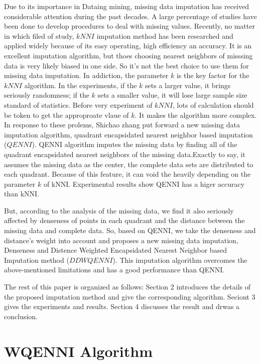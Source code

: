 \documentclass[print]{jicspack}
\begin{document}
Due to its importance in Dataing mining, missing data imputation has received considerable attention during the past decades. A large percentage of studies have been done to develop procedures to deal with missing values. Recently, no matter in which filed of study, $kNNI$ \cite{NumeApp} imputation method has been researched and applied widely because of its easy operating, high efficiency an accuracy. It is an excellent imputation algorithm, but thoes choosing nearest neighbors of misssing data is very likely biased in one side. So it's not the best choice to use them for missing data imputation. In addiction, the parameter $k$ is the key factor for the $kNNI$ algorithm. In the experiments, if the $k$ sets a larger value, it brings seriously randomness; if the $k$ sets a smaller value, it will lose large sample size standard of statistics. Before very experiment of $kNNI$, lots of calculation should be token to get the approproate vlaue of $k$. It makes the algorithm more complex. In response to these prolems, Shichao zhang \cite{NumeApp} put forward a new missing data imputation algorithm, quadrant encapsidated nearest neighbor based imputation ($QENNI$). QENNI algorithm imputes the missing data by finding all of the quadrant encapsidated nearest neighbors of the missing data.Exactly to say, it assumes the missing data as the center, the complete data sets are distributed to each quadrant. Because of this feature, it can void the heavily depending on the parameter $k$ of kNNI. Experimental results show QENNI has a higer accuracy than kNNI.

But, according to the analysis of the missing data, we find it also seriously affected by denseness of points in each quadrant and the distance between the missing data and complete data. So, based on QENNI,  we take the denseness and distance's weight into account and proposes a new missing data imputation, Denseness and Distence Weighted Encapsidated Nearest Neighbor based Imputation method ($DDWQENNI$). This imputation algorithm overcomes the above-mentioned limitations and has a good performance than QENNI.

The rest of this paper is organized as follows: Section 2 introduces the details of the proposed imputation method and give the corresponding algorithm. Seciont 3 gives the experiments and results. Section 4 discusses the result and drwas a conclusion.

\section{WQENNI Algorithm}
\label{Maintext}
\end{document}
